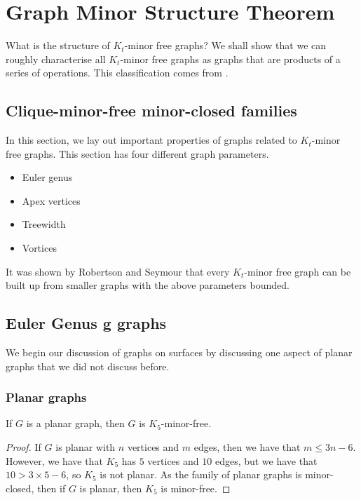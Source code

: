 
\section{Graph Minor Structure Theorem}\label{sec:Kt_Minor_Free}
What is the structure of \(K_t\)-minor free graphs? We shall show that we can roughly characterise all \(K_t\)-minor free graphs as graphs that are products of a series of operations. This classification comes from \cite{robertsonGraphMinorsXVI2003}.
\subsection{Clique-minor-free minor-closed families}\label{ssec:Kt_Minor_Closed_families}
In this section, we lay out important properties of graphs related to \(K_t\)-minor free graphs. This section has four different graph parameters.
\begin{itemize}
	\item Euler genus
	\item Apex vertices
	\item Treewidth
	\item Vortices
\end{itemize}
It was shown by Robertson and Seymour \cite{robertsonGraphMinorsXX2004} that every \(K_t\)-minor free graph can be built up from smaller graphs with the above parameters bounded.
\subsection{Euler Genus g graphs}
We begin our discussion of graphs on surfaces by discussing one aspect of planar graphs that we did not discuss before. 
\subsubsection{Planar graphs}\label{sssec:K_5-free_Planar}
\begin{theorem}\label{thm:K5_Free_Planar}
	If \(G\) is a planar graph, then \(G\) is \(K_5\)-minor-free.
\end{theorem}
\begin{proof}
	If \(G\) is planar with \(n\) vertices and \(m\) edges, then we have that \(m \leq 3n -6\). However, we have that \(K_5\) has \(5\) vertices and \(10\) edges, but we have that \( 10 > 3 \times 5 - 6\), so \(K_5\) is not planar. As the family of planar graphs is minor-closed, then if \(G\) is planar, then \(K_5\) is minor-free.
\end{proof}

